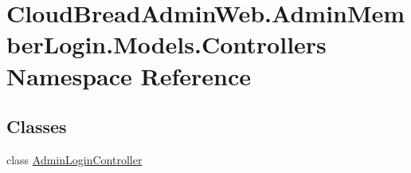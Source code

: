 \hypertarget{namespace_cloud_bread_admin_web_1_1_admin_member_login_1_1_models_1_1_controllers}{}\section{Cloud\+Bread\+Admin\+Web.\+Admin\+Member\+Login.\+Models.\+Controllers Namespace Reference}
\label{namespace_cloud_bread_admin_web_1_1_admin_member_login_1_1_models_1_1_controllers}
\subsection*{Classes}
\begin{DoxyCompactItemize}
\item 
class \hyperlink{class_cloud_bread_admin_web_1_1_admin_member_login_1_1_models_1_1_controllers_1_1_admin_login_controller}{Admin\+Login\+Controller}
\end{DoxyCompactItemize}
